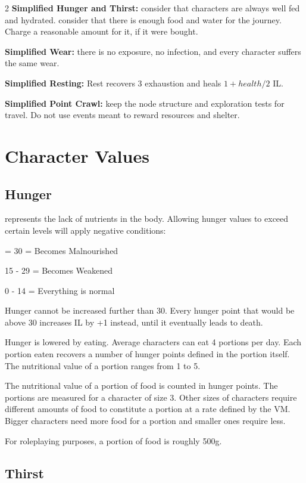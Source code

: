 \begin{multicols}{2}
\textbf{Simplified Hunger and Thirst:} consider that characters are always well fed and hydrated. consider that there is enough food and water for the journey. Charge a reasonable amount for it, if it were bought.

\textbf{Simplified Wear:} there is no exposure, no infection, and every character suffers the same wear.

\textbf{Simplified Resting:} Rest recovers 3 exhaustion and heals $1+ health/2$ IL.

\textbf{Simplified Point Crawl:} keep the node structure and exploration tests for travel. Do not use events meant to reward resources and shelter.

\section{Character Values}

\subsection{Hunger} represents the lack of nutrients in the body. Allowing hunger values to exceed certain levels will apply negative conditions:

\begin{proplist}
    \item = 30 = Becomes Malnourished
    \item 15 - 29 = Becomes Weakened
    \item 0 - 14 = Everything is normal
\end{proplist}

Hunger cannot be increased further than 30. Every hunger point that would be above 30 increases IL by +1 instead, until it eventually leads to death.

Hunger is lowered by eating. Average characters can eat 4 portions per day. Each portion eaten recovers a number of hunger points defined in the portion itself. The nutritional value of a portion ranges from 1 to 5.

The nutritional value of a portion of food is counted in hunger points. The portions are measured for a character of size 3. Other sizes of characters require different amounts of food to constitute a portion at a rate defined by the VM. Bigger characters need more food for a portion and smaller ones require less.

For roleplaying purposes, a portion of food is roughly 500g.

\subsection{Thirst}


\end{multicols}

